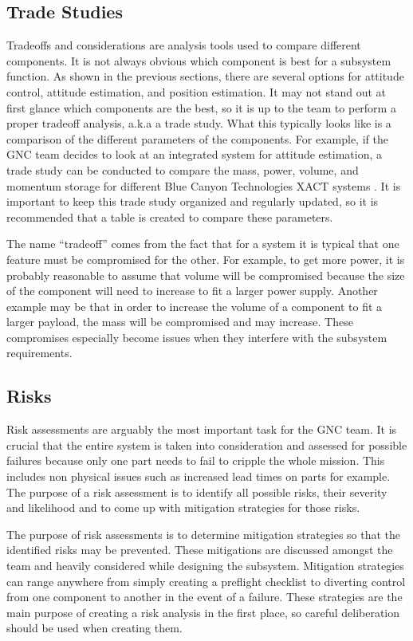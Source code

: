 \subsection{Trade Studies}

Tradeoffs and considerations are analysis tools used to compare
different components. It is not always obvious which component is best
for a subsystem function. As shown in the previous sections, there are several
options for attitude control, attitude estimation, and position
estimation. It may not stand out at first glance which components are
the best, so it is up to the team to perform a proper tradeoff
analysis, a.k.a a trade study. What this typically looks like is a
comparison of the different parameters of the components. For example,
if the GNC team decides to look at an integrated system for attitude
estimation, a trade study can be conducted to compare the mass, power,
volume, and momentum storage for different Blue Canyon Technologies
XACT systems \cite{qp20}. It is important to keep this trade study organized
and regularly updated, so it is recommended that a table is created to
compare these parameters.  

The name “tradeoff” comes from the fact that for a system it is
typical that one feature must be compromised for the other. For
example, to get more power, it is probably reasonable to assume that
volume will be compromised because the size of the component will need
to increase to fit a larger power supply. Another example may be that
in order to increase the volume of a component to fit a larger
payload, the mass will be compromised and may increase. These
compromises especially become issues when they interfere with the
subsystem requirements.

\subsection{Risks}

Risk assessments are arguably the most important task for the GNC
team. It is crucial that the entire system is taken into consideration
and assessed for possible failures because only one part needs to fail
to cripple the whole mission. This includes non physical issues such
as increased lead times on parts for example. The purpose of a risk
assessment is to identify all possible risks, their severity and
likelihood and to come up with mitigation strategies for those risks. 

The purpose of risk assessments is to determine mitigation strategies
so that the identified risks may be prevented. These mitigations are
discussed amongst the team and heavily considered while designing the
subsystem. Mitigation strategies can range anywhere from simply
creating a preflight checklist to diverting control from one component
to another in the event of a failure. These strategies are the main
purpose of creating a risk analysis in the first place, so careful
deliberation should be used when creating them. 

